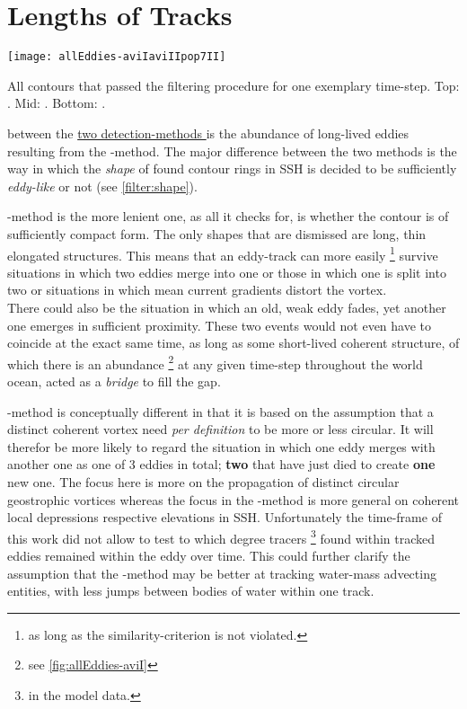 \label{chap:discussion}

\section{Lengths of Tracks}
\begin{marginfigure}
	\texttt{[image: allEddies-aviIaviIIpop7II]}
	\caption{All contours that passed the filtering procedure for one exemplary time-step. Top: \aviI. Mid: \aviII. Bottom: \popSevenII.}
	\label{fig:allEddies-aviIaviIIpop7II}
\end{marginfigure}
 between the \href{box:MI}{two detection-methods } is the abundance of long-lived eddies resulting from the \MI-method. The major difference between the two methods is the way in which the \textit{shape} of found contour rings in SSH is decided to be sufficiently \textit{eddy-like} or not (see \cref{filter:shape}).

 \MI-method is the more lenient one, as all it checks for, is whether the contour is of sufficiently compact form. The only shapes that are dismissed are long, thin elongated structures. This means that \eg an eddy-track can more easily \footnote{as long as the similarity-criterion is not violated.} survive situations in which two eddies merge into one or those in which one is split into two or situations in which mean current gradients distort the vortex.\\ There could also be the situation in which an old, weak eddy fades, yet another one emerges in sufficient proximity. These two events would not even have to coincide at the exact same time, as long as some short-lived coherent structure, of which there is an abundance \footnote{see \cref{fig:allEddies-aviI}} at any given time-step throughout the world ocean, acted as a \textit{bridge} to fill the gap.


 \MII-method is conceptually different in that it is based on the assumption that a distinct coherent vortex need \textit{per definition} to be more or less circular. It will therefor be more likely to regard \eg the situation in which one eddy merges with another one as one of 3 eddies in total; \textbf{two} that have just died to create \textbf{one} new one.
The focus here is more on the propagation of distinct circular geostrophic vortices whereas the focus in the \MI-method is more general on coherent local depressions respective elevations in SSH. Unfortunately the time-frame of this work did not allow to test to which degree tracers \footnote{in the model data.} found within tracked eddies remained within the eddy over time. This could further clarify the assumption that the \MI-method may be better at tracking water-mass advecting entities, with less jumps between bodies of water within one track.

